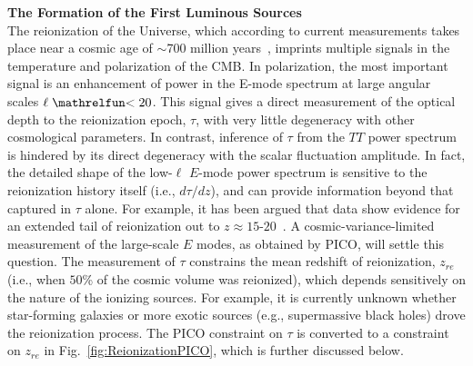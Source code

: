 \documentclass[PICOReport.tex]{subfiles}
\begin{document}

{\bf The Formation of the First Luminous Sources}\\
The reionization of the Universe, which according to current measurements takes place near a cosmic age of $\sim$700 million 
years~\citep{planckreion}, imprints multiple signals in the temperature and polarization of the CMB.  In polarization, the most 
important signal is an enhancement of power in the E-mode spectrum at large angular scales $\ell \simlt 20$. 
This signal gives a direct measurement of the optical depth to the reionization epoch, $\tau$, with very little degeneracy with other 
cosmological parameters.  In contrast, inference of $\tau$ from the $TT$ power spectrum is hindered by its direct degeneracy with the scalar fluctuation amplitude.  In fact, the detailed shape of the low-$\ell$ $E$-mode power spectrum is sensitive to the reionization history itself (i.e., $d\tau/dz$), and can provide information beyond that captured in $\tau$ alone.  For example, it has been argued that \planck data show evidence for an extended tail of reionization out to $z \approx 15$-$20$~\cite{Miranda2017}.  A cosmic-variance-limited measurement of the large-scale $E$ modes, as obtained by PICO, will settle this question.  The measurement of $\tau$ constrains the mean redshift of reionization, $z_{re}$ (i.e., when $50$\% of the cosmic volume was reionized), which depends sensitively on the nature of the ionizing sources.  For example, it is currently unknown whether star-forming galaxies or more exotic sources (e.g., supermassive black holes) drove the reionization process.  The PICO constraint on $\tau$ is converted to a constraint on $z_{re}$ in Fig.~\ref{fig:ReionizationPICO}, which is further discussed below.  %
 
\end{document}
